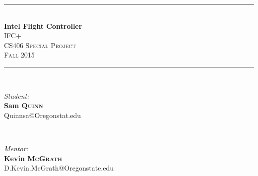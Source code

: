 \documentclass[letterpaper,10pt,notitlepage,fleqn]{article}
\begin{document}
\begin{titlepage}
\vspace*{\fill}

\newcommand{\HRule}{\rule{\linewidth}{0.5mm}} %

\center %


\HRule \\[0.4cm]
{ \huge \bfseries Intel Flight Controller}\\[0.4cm] %


\textsc{\LARGE IFC+}\\[0.5cm] %
\textsc{\Large CS406 Special Project}\\[0.5cm] %
\textsc{\large Fall 2015}\\[0.5cm] %


\HRule \\[1.5cm]

\begin{minipage}{0.4\textwidth}
\begin{flushleft} \large
\emph{Student:}\\
        \textbf{Sam \textsc{Quinn}} \\ %
        {\small Quinnsa@Oregonstat.edu}
        \end{flushleft}
        \end{minipage}
        ~
        \begin{minipage}{0.4\textwidth}
        \begin{flushright} \large
        \emph{Mentor:} \\
            \textbf{Kevin \textsc{McGrath}} \\ %
            {\small D.Kevin.McGrath@Oregonstate.edu}
            \end{flushright}
            \end{minipage}\\[3cm]


\end{titlepage}
\end{document}
